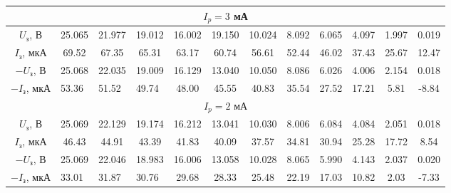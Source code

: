\documentclass[12pt,a4paper]{article}
\begin{document}
\begin{table}[H]
{\begin{tabular}[]{|c|c|c|c|c|c|c|c|c|c|c|c|}
        \multicolumn{12}{|c|}{$I_p = 3$ мА} \\
        \hline
        $U_з$, В                          & 25.065                     & 21.977                     & 19.012                     & 16.002 & 19.150 & 10.024 & 8.092 & 6.065 & 4.097 & 1.997 & 0.019 \\ \hline
$I_з$, мкА                        & 69.52                      & 67.35                      & 65.31                      & 63.17  & 60.74  & 56.61  & 52.44 & 46.02 & 37.43 & 25.67 & 12.47 \\ \hline
$-U_з$, В                         & 25.068                     & 22.035                     & 19.009                     & 16.129 & 13.040 & 10.050 & 8.086 & 6.026 & 4.006 & 2.154 & 0.018 \\ \hline
\multicolumn{1}{|l|}{$-I_з$, мкА} & \multicolumn{1}{l|}{53.36} & \multicolumn{1}{l|}{51.52} & \multicolumn{1}{l|}{49.74} & 48.00  & 45.55  & 40.83  & 35.54 & 27.52 & 17.21 & 5.81  & -8.84 \\ \hline
        \multicolumn{12}{|c|}{$I_p = 2$ мА} \\
        \hline
        $U_з$, В                          & 25.069                     & 22.129                     & 19.174                     & 16.212 & 13.041 & 10.030 & 8.006 & 6.084 & 4.084 & 2.051 & 0.018 \\ \hline
$I_з$, мкА                        & 46.43                      & 44.91                      & 43.39                      & 41.83  & 40.09  & 37.57  & 34.81 & 30.94 & 25.28 & 17.72 & 8.54  \\ \hline
$-U_з$, В                         & 25.069                     & 22.046                     & 18.983                     & 16.006 & 13.058 & 10.028 & 8.065 & 5.990 & 4.143 & 2.037 & 0.020 \\ \hline
\multicolumn{1}{|l|}{$-I_з$, мкА} & \multicolumn{1}{l|}{33.01} & \multicolumn{1}{l|}{31.87} & \multicolumn{1}{l|}{30.76} & 29.68  & 28.33  & 25.48  & 22.19 & 17.03 & 10.82 & 2.03  & -7.33 \\ \hline


\end{tabular}}
\end{table}
\end{document}

